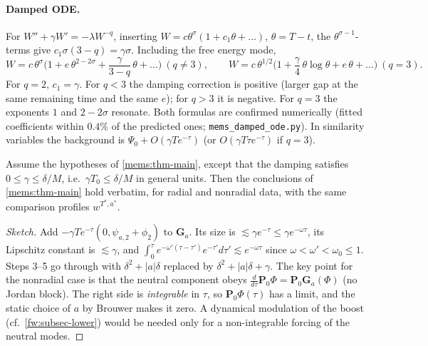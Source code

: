 \paragraph{Damped ODE.} For $W''+\gamma W'=-\lambda W^{-q}$, inserting
$W=c\theta^\sigma(1+c_1\theta+\dots)$, $\theta=T-t$, the $\theta^{\sigma-1}$-terms give
$c_1\sigma(3-q)=\gamma\sigma$. Including the free energy mode,
\begin{equation}\label{mems:dampedexp}
  W=c\,\theta^\sigma\Big(1+e\,\theta^{2-2\sigma}+\frac{\gamma}{3-q}\,\theta+\dots\Big)\ (q\ne3),\qquad
  W=c\,\theta^{1/2}\Big(1+\frac{\gamma}{4}\,\theta\log\theta+e\,\theta+\dots\Big)\ (q=3).
\end{equation}
For $q=2$, $c_1=\gamma$. For $q<3$ the damping correction is positive (larger gap at
the same remaining time and the same $e$); for $q>3$ it is negative. For $q=3$ the exponents $1$ and $2-2\sigma$ resonate. Both formulas are
confirmed numerically (fitted coefficients within $0.4\%$ of the predicted ones;
\texttt{mems\_damped\_ode.py}). In
similarity variables the background is $\Psi_0+O(\gamma Te^{-\tau})$ (or
$O(\gamma T\tau e^{-\tau})$ if $q=3$).

\begin{proposition}\label{mems:prop-damped}
Assume the hypotheses of \cref{mems:thm-main}, except that the damping
satisfies $0\le\gamma\le\delta/M$, i.e.\ $\gamma T_0\le\delta/M$ in general units.
Then the conclusions of \cref{mems:thm-main} hold verbatim, for radial and
nonradial data, with the same comparison profiles $w^{T^*,a^*}$.
\end{proposition}

\begin{proof}[Sketch]
Add $-\gamma Te^{-\tau}(0,\psi_{a,2}+\phi_2)$ to $\mathbf G_a$. Its size is
$\lesssim\gamma e^{-\tau}\le\gamma e^{-\omega\tau}$, its Lipschitz constant is $\lesssim\gamma$, and
$\int_0^\tau e^{-\omega'(\tau-\tau')}e^{-\tau'}d\tau'\lesssim e^{-\omega\tau}$ since $\omega<\omega'<\omega_0\le1$.
Steps 3--5 go through with $\delta^2+|a|\delta$ replaced by
$\delta^2+|a|\delta+\gamma$. The key point for the nonradial case is that the
neutral component obeys $\frac{d}{d\tau}\mathbf P_0\Phi=\mathbf P_0\mathbf G_a(\Phi)$
(no Jordan block). The right side is \emph{integrable} in $\tau$, so
$\mathbf P_0\Phi(\tau)$ has a limit, and the static choice of $a$ by Brouwer makes it
zero. A dynamical modulation of the boost (cf.\ \cref{fw:subsec-lower}) would
be needed only for a non-integrable forcing of the neutral modes.
\end{proof}

